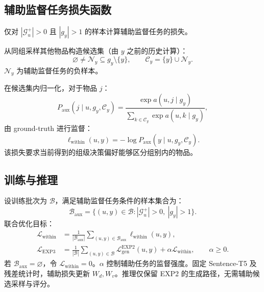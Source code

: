 \documentclass[UTF8,11pt,a4paper]{ctexart}
\begin{document}
\subsection{辅助监督任务损失函数}

仅对 $|\mathcal G_u^{+}|>0$ 且 $|g_y|>1$ 的样本计算辅助监督任务的损失。

从同组采样其他物品构造候选集（由 $y$ 之前的历史计算）：
\begin{equation}
 \varnothing\neq\mathcal N_y\subseteq g_y\setminus\{y\},\qquad
 \mathcal C_y=\{y\}\cup\mathcal N_y.
\end{equation}
$\mathcal N_y$ 为辅助监督任务的负样本。

在候选集内归一化，对于物品 $j$：
\begin{equation}
 P_{\mathrm{aux}}(j\mid u,g_y,\mathcal C_y)
 =\frac{\exp a(u,j\mid g_y)}
 {\sum_{k\in\mathcal C_y}\exp a(u,k\mid g_y)},
\end{equation}
由 ground-truth 进行监督：
\begin{equation}
 \ell_{\mathrm{within}}(u,y)
 =-\log P_{\mathrm{aux}}(y\mid u,g_y,\mathcal C_y).
\end{equation}
该损失要求当前得到的组级决策偏好能够区分组别内的物品。

\subsection{训练与推理}

设训练批次为 $\mathcal B$，满足辅助监督任务条件的样本集合为：
\begin{equation}
 \mathcal B_{\mathrm{aux}}
 =\{(u,y)\in\mathcal B:|\mathcal G_u^{+}|>0,\ |g_y|>1\}.
\end{equation}
联合优化目标：
\begin{align}
 \mathcal L_{\mathrm{within}}
 &=\frac{1}{|\mathcal B_{\mathrm{aux}}|}
 \sum_{(u,y)\in\mathcal B_{\mathrm{aux}}}\ell_{\mathrm{within}}(u,y),\\
 \mathcal L_{\mathrm{EXP3}}
 &=\frac{1}{|\mathcal B|}
 \sum_{(u,y)\in\mathcal B}\mathcal L_{\mathrm{gen}}^{\mathrm{EXP2}}(u,y)
 +\alpha\mathcal L_{\mathrm{within}},\qquad \alpha\geq0.
\end{align}
若 $\mathcal B_{\mathrm{aux}}=\varnothing$，令 $\mathcal L_{\mathrm{within}}=0$。$\alpha$ 控制辅助任务的监督强度。固定 Sentence-T5 及残差统计时，辅助损失更新 $W_d,W_v$。推理仅保留 EXP2 的生成路径，无需辅助候选采样与评分。
\end{document}
